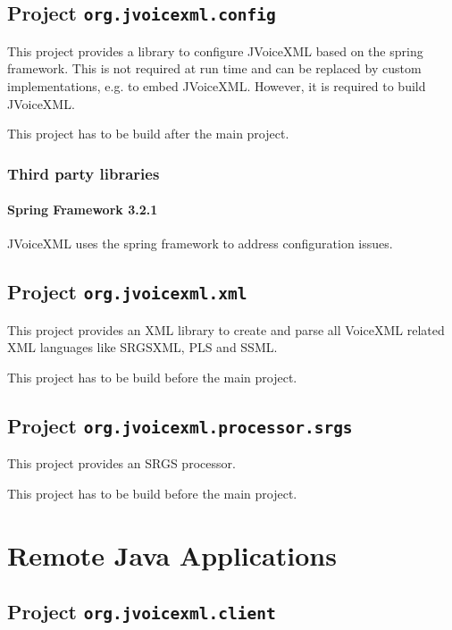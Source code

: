 \documentclass[11pt,a4paper]{article}
\begin{document}
\subsection{Project \texttt{org.jvoicexml.config}}
\label{sec:org.jvoicexml.config}

This project provides a library to configure JVoiceXML based on the spring
framework.
This is not required at run time and can be replaced by custom
implementations, e.g. to embed JVoiceXML. However, it is required to build
JVoiceXML.

This project has to be build after the main project.

\subsubsection{Third party libraries}
\label{sec:config-third-party-libr}

\paragraph{Spring Framework 3.2.1}
\label{sec:spring-framework}

JVoiceXML uses the spring framework to address configuration issues.

\subsection{Project \texttt{org.jvoicexml.xml}}
\label{sec:org.jvoicexml.xml}

This project provides an XML library to create and parse all VoiceXML related
XML languages like SRGSXML, PLS and SSML.

This project has to be build before the main project.

\subsection{Project \texttt{org.jvoicexml.processor.srgs}}
\label{sec:org.jvoicexml.processor.srgs}

This project provides an SRGS processor.

This project has to be build before the main project.

\section{Remote Java Applications}
\subsection{Project \texttt{org.jvoicexml.client}}
\end{document}

